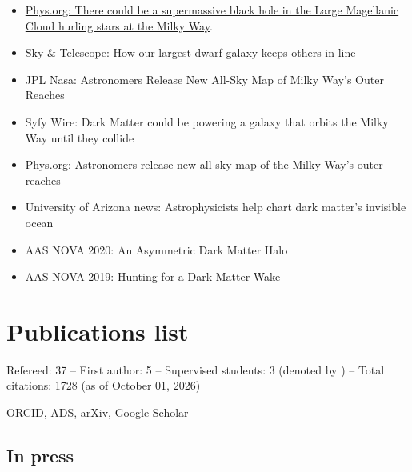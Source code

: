 \documentclass[14pt]{article}
\begin{document}
\begin{itemize}
  \setlength\itemsep{0.0em}
  \renewcommand\labelitemi{$\cdot$}
  \item
    \href{https://phys.org/news/2025-02-supermassive-black-hole-large-magellanic.html}{Phys.org: There
    could be a supermassive black hole in the Large Magellanic Cloud hurling
  stars at the Milky Way}.
  \item Sky \& Telescope: How our largest dwarf galaxy keeps others in line
  \item JPL Nasa: Astronomers Release New All-Sky Map of Milky Way’s Outer Reaches
  \item Syfy Wire: Dark Matter could be powering a galaxy that orbits the Milky Way until they collide
  \item Phys.org: Astronomers release new all-sky map of the Milky Way's outer reaches
 \item University of Arizona news: Astrophysicists help chart dark matter's invisible ocean
 \item AAS NOVA 2020: An Asymmetric Dark Matter Halo
 \item AAS NOVA 2019: Hunting for a Dark Matter Wake

\end{itemize}


\section*{Publications list}

Refereed: 37 -- First author: 5 -- Supervised students: 3 (denoted by \dag) -- Total citations: 1728 (as of October 01, 2026)

\noindent \href{https://orcid.org/0000-0001-7107-1744}{ORCID},
\href{https://ui.adsabs.harvard.edu/search/q=docs(library%2F0X5_bcuLT4iE-6-Nko0kmg)&sort=date%20desc%2C%20bibcode%20desc&p_=0}{ADS},
\href{https://arxiv.org/search/?query=garavito-camargo&searchtype=all}{arXiv},
\href{https://scholar.google.com/citations?user=QDLiOFYAAAAJ&hl=en&oi=ao}{Google Scholar}\\

\subsection*{In press}
\end{document}
